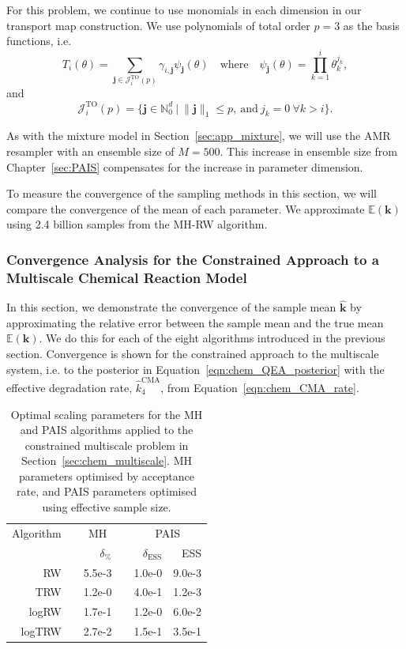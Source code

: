 \documentclass[final]{siamltex}
\begin{document}
For this problem, we continue to use monomials in each dimension in our transport map construction. We use polynomials of total order $p=3$ as the basis functions, i.e.
\[
	T_i(\theta) = \sum_{\mathbf{j}\in\mathcal{J}^{\text{TO}}_i(p)} \gamma_{i,\mathbf{j}}\psi_{\mathbf{j}}(\theta) \quad \text{where} \quad \psi_\mathbf{j}(\theta) = \prod\limits_{k=1}^i \theta_k^{j_k},
\]
and
\[
	\mathcal{J}^{\text{TO}}_i(p) = \{\mathbf{j} \in \mathbb{N}^d_0\ |\ \|\mathbf{j}\|_1 \leq p, \ \text{and}\ j_k = 0\ \forall k > i\}.
\]

As with the mixture model in Section~\ref{sec:app_mixture}, we will use the AMR resampler with an ensemble size of $M=500$. This increase in ensemble size from Chapter~\ref{sec:PAIS} compensates for the increase in parameter dimension.

To measure the convergence of the sampling methods in this section, we will compare the convergence of the mean of each parameter. We approximate $\mathbb{E}(\mathbf{k})$ using 2.4 billion samples from the MH-RW algorithm.

\subsubsection{Convergence Analysis for the Constrained Approach to a Multiscale Chemical Reaction Model}\label{sec:chem_conv}

In this section, we demonstrate the convergence of the sample mean $\hat{\mathbf{k}}$ by approximating the relative error between the sample mean and the true mean $\mathbb{E}(\mathbf{k})$. We do this for each of the eight algorithms introduced in the previous section. Convergence is shown for the constrained approach to the multiscale system, i.e. to the posterior in Equation~\eqref{eqn:chem_QEA_posterior} with the effective degradation rate, $\hat{k}_4^{\text{CMA}}$, from Equation~\eqref{eqn:chem_CMA_rate}.

\begin{table}[!h]
\centering
\begin{tabular}{rrrrrr}
\toprule
	\multicolumn{1}{l}{Algorithm} & \multicolumn{3}{c}{MH} & \multicolumn{2}{c}{PAIS} \\ \cmidrule(lr){2-4} \cmidrule(lr){5-6}
	& & $\delta_\%$ & & $\delta_{\text{ESS}}$ & ESS \\ \midrule
	RW & & 5.5e-3 & & 1.0e-0 & 9.0e-3 \\
	TRW & & 1.2e-0 & & 4.0e-1 & 1.2e-3 \\
	logRW & & 1.7e-1 & & 1.2e-0 & 6.0e-2 \\
	logTRW & & 2.7e-2 & & 1.5e-1 & 3.5e-1 \\
\bottomrule
\end{tabular}
\caption{Optimal scaling parameters for the MH and PAIS algorithms applied to the constrained multiscale problem in Section~\ref{sec:chem_multiscale}. MH parameters optimised by acceptance rate, and PAIS parameters optimised using effective sample size.}
\label{tab:chem_multiscale_scaling}
\end{table}
\end{document}
